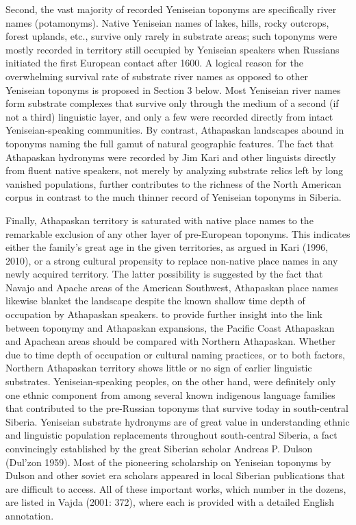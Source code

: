 Second, the vast majority of recorded Yeniseian toponyms are specifically river names (potamonyms). Native Yeniseian names of lakes, hills, rocky outcrops, forest uplands, etc., survive only rarely in substrate areas; such toponyms were mostly recorded in territory still occupied by Yeniseian speakers when Russians initiated the first European contact after 1600. A logical reason for the overwhelming survival rate of substrate river names as opposed to other Yeniseian toponyms is proposed in Section 3 below. Most Yeniseian river names form substrate complexes that survive only through the medium of a second (if not a third) linguistic layer, and only a few were recorded directly from intact Yeniseian-speaking communities. By contrast, Athapaskan landscapes abound in toponyms naming the full gamut of natural geographic features. The fact that Athapaskan hydronyms were recorded by Jim Kari and other linguists directly from fluent native speakers, not merely by analyzing substrate relics left by long vanished populations, further contributes to the richness of the North American corpus in contrast to the much thinner record of Yeniseian toponyms in Siberia.

Finally, Athapaskan territory is saturated with native place names to the remarkable exclusion of any other layer of pre-European toponyms. This indicates either the family’s great age in the given territories, as argued in Kari (1996, 2010), or a strong cultural propensity to replace non-native place names in any newly acquired territory. The latter possibility is suggested by the fact that Navajo and Apache areas of the American Southwest, Athapaskan place names likewise blanket the landscape despite the known shallow time depth of occupation by Athapaskan speakers. to provide further insight into the link between toponymy and Athapaskan expansions, the Pacific Coast Athapaskan and Apachean areas should be compared with Northern Athapaskan. Whether due to time depth of occupation or cultural naming practices, or to both factors, Northern Athapaskan territory shows little or no sign of earlier linguistic substrates. Yeniseian-speaking peoples, on the other hand, were definitely only one ethnic component from among several known indigenous language families that contributed to the pre-Russian toponyms that survive today in south-central Siberia. Yeniseian substrate hydronyms are of great value in understanding ethnic and linguistic population replacements throughout south-central Siberia, a fact convincingly established by the great Siberian scholar Andreas P. Dulson (Dul’zon 1959). Most of the pioneering scholarship on Yeniseian toponyms by Dulson and other soviet era scholars appeared in local Siberian publications that are difficult to access. All of these important works, which number in the dozens, are listed in Vajda (2001: 372), where each is provided with a detailed English annotation.

